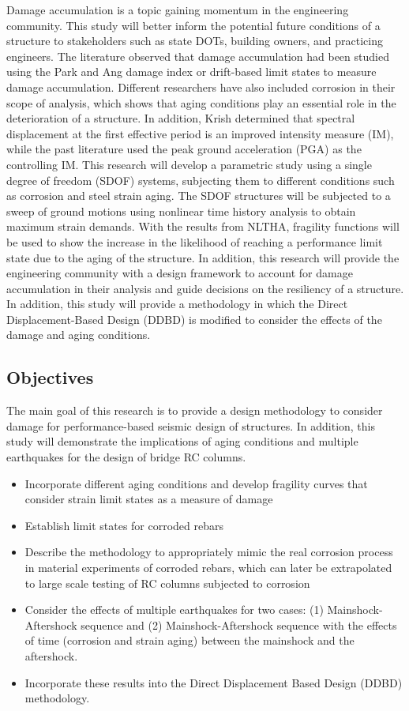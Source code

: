 Damage accumulation is a topic gaining momentum in the engineering community. This study will better inform the potential future conditions of a structure to stakeholders such as state DOTs, building owners, and practicing engineers. The literature observed that damage accumulation had been studied using the Park and Ang damage index or drift-based limit states to measure damage accumulation. Different researchers have also included corrosion in their scope of analysis, which shows that aging conditions play an essential role in the deterioration of a structure. In addition, Krish \cite{Krish2018} determined that spectral displacement at the first effective period is an improved intensity measure (IM), while the past literature used the peak ground acceleration (PGA) as the controlling IM. This research will develop a parametric study using a single degree of freedom (SDOF) systems, subjecting them to different conditions such as corrosion and steel strain aging. The SDOF structures will be subjected to a sweep of ground motions using nonlinear time history analysis to obtain maximum strain demands. With the results from NLTHA, fragility functions will be used to show the increase in the likelihood of reaching a performance limit state due to the aging of the structure. In addition, this research will provide the engineering community with a design framework to account for damage accumulation in their analysis and guide decisions on the resiliency of a structure. In addition, this study will provide a methodology in which the Direct Displacement-Based Design (DDBD) is modified to consider the effects of the damage and aging conditions.

\subsection{Objectives}
The main goal of this research is to provide a design methodology to consider damage for performance-based seismic design of structures. In addition, this study will demonstrate the implications of aging conditions and multiple earthquakes for the design of bridge RC columns.


\begin{itemize}
	\item Incorporate different aging conditions and develop fragility curves that consider strain limit states as a measure of damage
	\item Establish limit states for corroded rebars
	\item Describe the methodology to appropriately mimic the real corrosion process in material experiments of corroded rebars, which can later be extrapolated to large scale testing of RC columns subjected to corrosion
	\item Consider the effects of multiple earthquakes for two cases: (1) Mainshock-Aftershock sequence and (2) Mainshock-Aftershock sequence with the effects of time (corrosion and strain aging) between the mainshock and the aftershock.
	\item Incorporate these results into the Direct Displacement Based Design (DDBD) methodology.
\end{itemize}